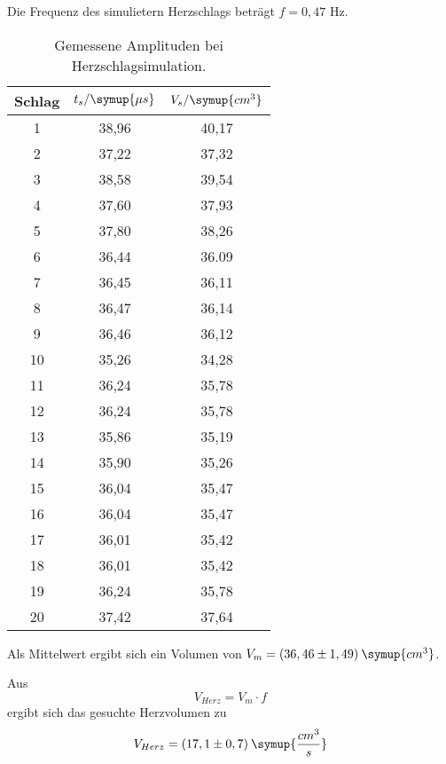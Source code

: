Die Frequenz des simulietern Herzschlags beträgt $f = 0,47$ Hz.
\begin{table}[H]
  \centering
  \caption{Gemessene Amplituden bei Herzschlagsimulation.}
  \label{tab:spannung1}
  \begin{tabular}{c c c }
    \toprule
  Schlag & $t_s/\symup{\mu s}$ & $V_s/\symup{cm^3}$ \\
    \midrule
    1  &  38,96 & 40,17     \\
    2  &  37,22 & 37,32     \\
    3  &  38,58 & 39,54     \\
    4  &  37,60 & 37,93     \\
    5  &  37,80 & 38,26     \\
    6  &  36,44 & 36.09     \\
    7  &  36,45 & 36,11     \\
    8  &  36,47 & 36,14     \\
    9  &  36,46 & 36,12     \\
    10 &  35,26 & 34,28      \\
    11 &  36,24 & 35,78     \\
    12  &  36,24 & 35,78     \\
    13  &  35,86 & 35,19     \\
    14  &  35,90 & 35,26     \\
    15  &  36,04 & 35,47     \\
    16  &  36,04 & 35,47     \\
    17  &  36,01 & 35,42     \\
    18  &  36,01 & 35,42     \\
    19  &  36,24 & 35,78     \\
    20  &  37,42 & 37,64     \\
    \bottomrule
  \end{tabular}
\end{table}

Als Mittelwert ergibt sich ein Volumen von $V_{m} = (36,46 \pm 1,49) \: \symup{cm^3}$.

Aus
\begin{equation*}
  V_{Herz} = V_m \cdot f
\end{equation*}
ergibt sich das gesuchte Herzvolumen zu
\begin{equation*}
  V_{Herz} = (17,1 \pm 0,7) \: \symup{\frac{cm^3}{s}}
\end{equation*}
